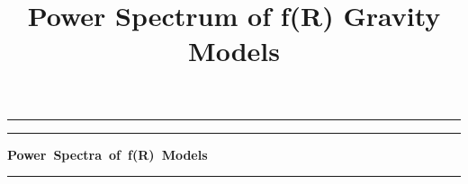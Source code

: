 \documentclass[12pt,a4paper]{article}
\begin{document}
\title{Power Spectrum of f(R) Gravity Models}

\newcommand{\dd}{\mathrm d}
\newcommand{\HH}{\mathcal H}
\newcommand{\CN}{{\it Cosmologia Notebook}}
\newenvironment{eqnset}
{\begin{equation}\left \bracevert \begin{array}{l}}
{\end{array} \right. \end{equation}}

\newenvironment{eqn}
{\begin{equation}\left \bracevert \begin{array}{l}}
{\end{array} \right. \end{equation}}


\newpage    %
\hrule\vspace{1pt}\hrule
\begin{center}
\mbox{{\bf Power Spectra of f(R) Models}} \\
\vspace{0.5em}
\mbox{{}}
\end{center}
\hrule

\setcounter{section}{1}
\end{document}

